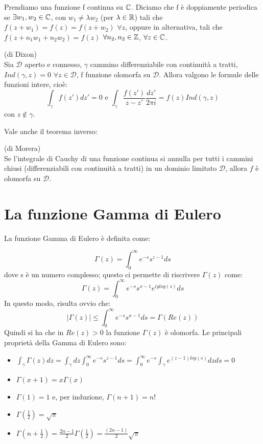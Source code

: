 Prendiamo una funzione f continua su $\mathbb{C}$. Diciamo che f è doppiamente periodica se $\exists w_1,w_2 \in \mathbb{C}$, con $w_1 \neq \lambda w_2$ (per $\lambda \in \mathbb{R}$) tali che $f(z+w_1)=f(z)=f(z+w_2)$ $\forall z$, oppure in alternativa, tali che $f(z+n_1w_1+n_2w_2)=f(z)$ $\forall n_2, n_2 \in \mathbb{Z}$, $\forall z \in \mathbb{C}$.
\begin{teorema} (di Dixon)\\
Sia $\mathcal{D}$ aperto e connesso, $\gamma$ cammino differenziabile con continuità  a tratti, $Ind(\gamma,z)=0$ $\forall z \in \mathcal{D}$, f funzione olomorfa su $\mathcal{D}$. Allora valgono le formule delle funzioni intere, cioè:
$$\int_{\gamma} f(z') dz'=0 \text{ e } \int_{\gamma} \frac{f(z')}{z-z'} \frac{dz'}{2 \pi i}=f(z) Ind(\gamma,z)$$
con $z \notin \gamma$.
\end{teorema}
Vale anche il teorema inverso:
\begin{teorema} (di Morera)\\
Se l'integrale di Cauchy di una funzione continua si annulla per tutti i cammini chiusi (differenziabili con continuità a tratti) in un dominio limitato $\mathcal{D}$, allora $f$ è olomorfa su $\mathcal{D}$.
\end{teorema}

\section{La funzione Gamma di Eulero}

La funzione Gamma di Eulero è definita come:

\begin{equation}
\Gamma (z)= \int_0 ^{\infty} e^{-s} s^{z-1} ds
\end{equation}
dove s è un numero complesso; questo ci permette di riscrivere $\Gamma (z)$ come:
$$\Gamma (z)=\int_0 ^{\infty} e^{-s} s^{x-1} e^{iy log(s)} ds$$
In questo modo, risulta ovvio che:
$$|\Gamma (z)| \leq \int_0 ^{\infty} e^{-s} s^{x-1} ds = \Gamma (Re(z))$$
Quindi si ha che in $Re(z)>0$ la funzione $\Gamma(z)$ è olomorfa. Le principali proprietà della Gamma di Eulero sono:
\begin{itemize}
\item $\int_{\gamma} \Gamma (z) dz=\int_{\gamma} dz \int_0 ^{\infty} e^{-s} s^{z-1} ds= \int_0 ^{\infty} e^{-s} \int_{\gamma} e^{(z-1)log(s)} dz ds=0$
\item $\Gamma (x+1) = x \Gamma (x)$
\item $\Gamma (1)=1$ e, per induzione, $\Gamma (n+1)=n!$
\item $\Gamma (\frac{1}{2}) = \sqrt{\pi}$
\item $\Gamma (n+ \frac{1}{2})= \frac{2n-1}{2} \Gamma (\frac{1}{2})= \frac{(2n-1)}{2} \sqrt{\pi}$
\end{itemize}

